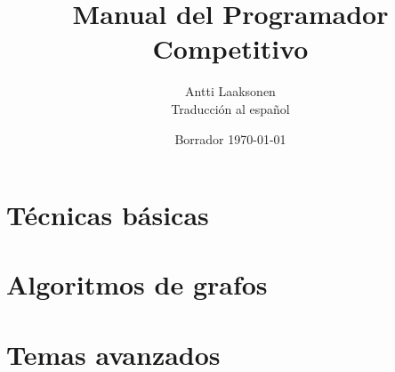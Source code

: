 \documentclass[twoside,12pt,a4paper,spanish]{book}
\date{Borrador \today}
\title{\Huge Manual del Programador Competitivo}
\author{\Large Antti Laaksonen \\ \normalsize Traducción al español}
\begin{document}


\frontmatter
\maketitle
\setcounter{tocdepth}{1}
\tableofcontents



\mainmatter
{}
\setcounter{page}{1}

\newcommand{\key}[1] {\textbf{#1}}

\part{Técnicas básicas}










\part{Algoritmos de grafos}
%
%
%
%
%
%
%
%
%
%
\part{Temas avanzados}
%
%
%
%
%
%
%
%
%
%

\cleardoublepage
{}
{}


\cleardoublepage
\printindex
\end{document}
